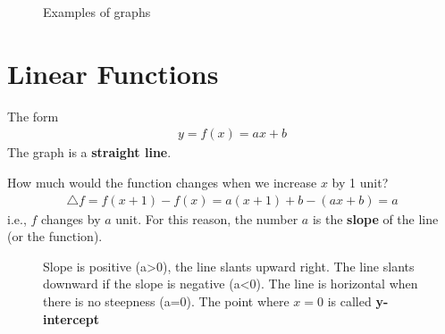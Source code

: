 \documentclass[10pt,a4paper]{book}
\theoremstyle{definition}\newtheorem{definition}{Definition}
\theoremstyle{definition}\newtheorem{fact}{Fact}
\theoremstyle{definition}\newtheorem{ex}{Ex.}
\theoremstyle{definition}\newtheorem{project}{Project}
\theoremstyle{definition}\newtheorem{problem}{Problem}
\theoremstyle{definition}\newtheorem{example}{Example}
\numberwithin{theorem}{chapter}
\numberwithin{corollary}{chapter}
\numberwithin{assumption}{chapter}
\numberwithin{definition}{chapter}
\numberwithin{prop}{chapter}
\numberwithin{notation}{chapter}
\numberwithin{problem}{chapter}
\numberwithin{example}{chapter}
\numberwithin{fact}{chapter}
\numberwithin{ex}{chapter}
\begin{document}
	\begin{figure}[ht]
		\caption{Examples of graphs}
	\end{figure}
	
	\section{Linear Functions}
	The form
	\begin{align*}
		y = f(x) = ax + b 
	\end{align*}
	The graph is a \textbf{straight line}. 
	
	How much would the function changes when we increase $x$ by 1 unit?
	\begin{align*}
		\triangle f = f(x+1) - f(x) = a(x+1) + b - (ax + b) = a 
	\end{align*}
	i.e., $f$ changes by $a$ unit. For this reason, the number $a$ is the \textbf{slope} of the line (or the function).
	
	\begin{figure}[ht]
		\caption{Slope is positive (a>0), the line slants upward right. The line slants downward if the slope is negative (a<0). The line is horizontal when there is no steepness (a=0). The point where $x=0$ is called \textbf{y-intercept}}
	\end{figure}
	
\end{document}
